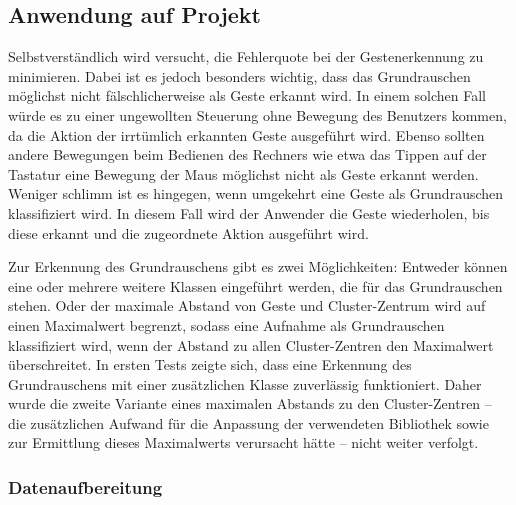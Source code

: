 \subsection{Anwendung auf Projekt}
Selbstverständlich wird versucht, die Fehlerquote bei der Gestenerkennung zu minimieren. Dabei ist es jedoch besonders wichtig, dass das Grundrauschen möglichst nicht fälschlicherweise als Geste erkannt wird. In einem solchen Fall würde es zu einer ungewollten Steuerung ohne Bewegung des Benutzers kommen, da die Aktion der irrtümlich erkannten Geste ausgeführt wird. Ebenso sollten andere Bewegungen beim Bedienen des Rechners wie etwa das Tippen auf der Tastatur eine Bewegung der Maus möglichst nicht als Geste erkannt werden.
Weniger schlimm ist es hingegen, wenn umgekehrt eine Geste als Grundrauschen klassifiziert wird. In diesem Fall wird der Anwender die Geste wiederholen, bis diese erkannt und die zugeordnete Aktion ausgeführt wird.

Zur Erkennung des Grundrauschens gibt es zwei Möglichkeiten: Entweder können eine oder mehrere weitere Klassen eingeführt werden, die für das Grundrauschen stehen. Oder der maximale Abstand von Geste und Cluster-Zentrum wird auf einen Maximalwert begrenzt, sodass
eine Aufnahme als Grundrauschen klassifiziert wird, wenn der Abstand zu allen Cluster-Zentren den Maximalwert überschreitet.
In ersten Tests zeigte sich, dass eine Erkennung des Grundrauschens mit einer zusätzlichen Klasse zuverlässig funktioniert. Daher wurde die zweite Variante eines maximalen Abstands zu den Cluster-Zentren -- die zusätzlichen Aufwand für die Anpassung der verwendeten Bibliothek sowie zur Ermittlung dieses Maximalwerts verursacht hätte -- nicht weiter verfolgt.


\subsubsection{Datenaufbereitung}


